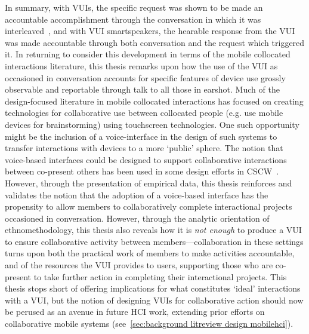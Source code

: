 {\begin{revisedsubmission}
In summary, with \acp{VUI}, the specific request was shown to be made an accountable accomplishment through the conversation in which it was interleaved~\citep{Porcheron2017}, and with \ac{VUI} smartspeakers, the hearable response from the \ac{VUI} was made accountable through both conversation and the request which triggered it.
In returning to consider this development in terms of the mobile collocated interactions literature, this thesis remarks upon how the use of the \ac{VUI} as occasioned in conversation accounts for specific features of device use grossly observable and reportable through talk to all those in earshot.
Much of the design-focused literature in mobile collocated interactions has focused on creating technologies for collaborative use between collocated people (e.g. \citet{Lucero2010d} use mobile devices for brainstorming) using touchscreen technologies.
One such opportunity might be the inclusion of a voice-interface in the design of such systems to transfer interactions with devices to a more `public' sphere.
The notion that voice-based interfaces could be designed to support collaborative interactions between co-present others has been used in some design efforts in \ac{CSCW}~\citep{Jones2012}.
However, through the presentation of empirical data, this thesis reinforces and validates the notion that the adoption of a voice-based interface has the propensity to allow members to collaboratively complete interactional projects occasioned in conversation.
However, through the analytic orientation of ethnomethodology, this thesis also reveals how it is \textit{not enough} to produce a \ac{VUI} to ensure collaborative activity between members---collaboration in these settings turns upon both the practical work of members to make activities accountable, and of the resources the \ac{VUI} provides to users, supporting those who are co-present to take further action in completing their interactional projects.
This thesis stops short of offering implications for what constitutes `ideal' interactions with a \ac{VUI}, but the notion of designing \acp{VUI} for collaborative action should now be perused as an avenue in future \ac{HCI} work, extending prior efforts on collaborative mobile systems (see~\ref{sec:background litreview design mobilehci}).
\end{revisedsubmission}






}
